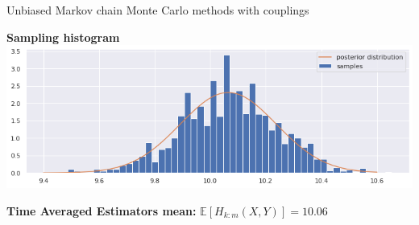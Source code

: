 \documentclass{beamer}
\begin{document}
\begin{section}{Unbiased Markov chain Monte Carlo methods with couplings}
\begin{frame}
		\vspace{0.2cm}
	
		\begin{minipage}{0.48\textwidth}
			\begin{center}
				{\scriptsize \textbf{Sampling histogram}}
				\includegraphics[width=\textwidth]{immagini_coupling/hist_coupling}
			\end{center}
		\end{minipage}
		\hfill
		\begin{minipage}{0.48\textwidth}
			\begin{center}
				{\small\textbf{Time Averaged Estimators mean:}}
				$ \mathbb{E}[H_{k:m}(X,Y)] = 10.06$
			\end{center}
		\end{minipage}
		
	\end{frame}
	
\end{section}
\end{document}
